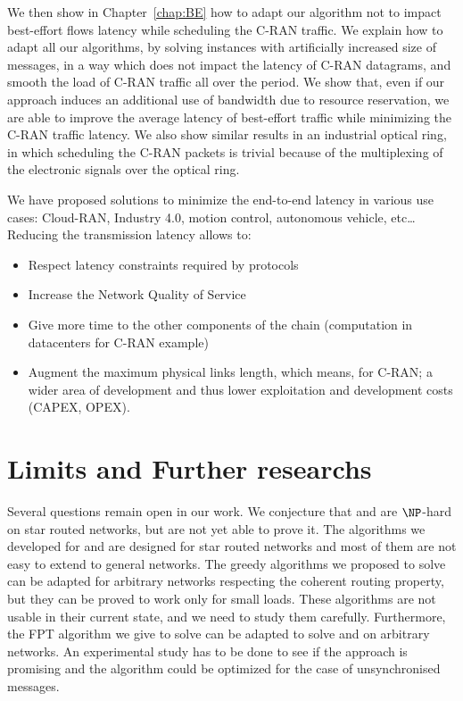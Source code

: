 We then show in Chapter~\ref{chap:BE} how to adapt our algorithm not to impact best-effort flows latency while scheduling the C-RAN traffic. We explain how to adapt all our algorithms, by solving instances with artificially increased size of messages, in a way which does not impact the latency of C-RAN datagrams, and smooth the load of C-RAN traffic all over the period. 
 We show that, even if our approach induces an additional use of bandwidth due to resource reservation, we are able to improve the average latency of best-effort traffic while minimizing the C-RAN traffic latency. We also show similar results in an industrial optical ring, in which scheduling the C-RAN packets is trivial because of the multiplexing of the electronic signals over the optical ring.

We have proposed solutions to minimize the end-to-end latency in various use cases: Cloud-RAN, Industry 4.0, motion control, autonomous vehicle, etc\ldots
Reducing the transmission latency allows to:
\begin{itemize}
	\item Respect latency constraints required by protocols
	\item Increase the Network Quality of Service 
	\item Give more time to the other components of the chain (computation in datacenters for C-RAN example) 
	\item Augment the maximum physical links length, which means, for C-RAN; a wider area of development and thus lower exploitation and development costs (CAPEX, OPEX).
\end{itemize} 

\section*{Limits and Further researchs}

Several questions remain open in our work. We conjecture that \pazl and \pall are $\NP$-hard on star routed networks, but are not yet able to prove it. 
The algorithms we developed for \pazl and \pall are designed for star routed networks and most of them are not easy to extend to general networks. The greedy algorithms we proposed to solve \pazl can be adapted for arbitrary networks respecting the coherent routing property, but they can be proved to work only for small loads. These algorithms are not usable in their current state, and we need to study them carefully. Furthermore, the FPT algorithm we give to solve \minstra can be adapted to solve \pazl and \pall on arbitrary networks.
An experimental study has to be done to see if the approach is promising and the algorithm could be optimized for the case of unsynchronised messages.

